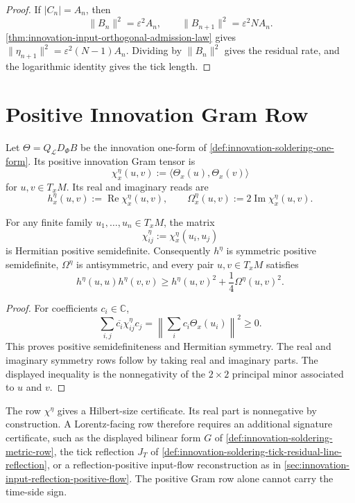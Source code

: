 \begin{proof}
If $|C_n|=A_n$, then
$$
\|B_n\|^2=\varepsilon^2A_n,
\qquad
\|B_{n+1}\|^2=\varepsilon^2NA_n.
$$
\autoref{thm:innovation-input-orthogonal-admission-law} gives
$\|\eta_{n+1}\|^2=\varepsilon^2(N-1)A_n$. Dividing by $\|B_n\|^2$ gives
the residual rate, and the logarithmic identity gives the tick length.
\end{proof}

\section{Positive Innovation Gram Row}
\label{sec:innovation-input-positive-gram-row}

\begin{definition}
\label{def:innovation-input-gram-tensor}
Let $\Theta=Q_{\mathcal L}D_{\Phi}B$ be the innovation one-form of
\autoref{def:innovation-soldering-one-form}. Its positive innovation Gram
tensor is
$$
\chi^\eta_x(u,v)
:=
\langle \Theta_x(u),\Theta_x(v)\rangle
$$
for $u,v\in T_xM$. Its real and imaginary reads are
$$
h^\eta_x(u,v):=\operatorname{Re}\chi^\eta_x(u,v),
\qquad
\Omega^\eta_x(u,v):=2\operatorname{Im}\chi^\eta_x(u,v).
$$
\end{definition}

\begin{theorem}
\label{thm:innovation-input-positive-gram-constraint}
For any finite family $u_1,\ldots,u_n\in T_xM$, the matrix
$$
\chi^\eta_{ij}:=\chi^\eta_x(u_i,u_j)
$$
is Hermitian positive semidefinite. Consequently $h^\eta$ is symmetric
positive semidefinite, $\Omega^\eta$ is antisymmetric, and every pair
$u,v\in T_xM$ satisfies
$$
h^\eta(u,u)h^\eta(v,v)
\ge
h^\eta(u,v)^2+\frac14\Omega^\eta(u,v)^2.
$$
\end{theorem}

\begin{proof}
For coefficients $c_i\in\mathbb C$,
$$
\sum_{i,j}\overline{c_i}\chi^\eta_{ij}c_j
=
\left\|\sum_i c_i\Theta_x(u_i)\right\|^2
\ge0.
$$
This proves positive semidefiniteness and Hermitian symmetry. The real and
imaginary symmetry rows follow by taking real and imaginary parts. The
displayed inequality is the nonnegativity of the $2\times2$ principal minor
associated to $u$ and $v$.
\end{proof}

\begin{principle}
\label{prin:innovation-input-positive-size-not-lorentz}
The row $\chi^\eta$ gives a Hilbert-size certificate. Its real part is
nonnegative by construction. A Lorentz-facing row therefore requires an
additional signature certificate, such as the displayed bilinear form
$G$ of \autoref{def:innovation-soldering-metric-row}, the tick reflection
$J_T$ of \autoref{def:innovation-soldering-tick-residual-line-reflection},
or a reflection-positive input-flow reconstruction as in
\autoref{sec:innovation-input-reflection-positive-flow}. The positive Gram
row alone cannot carry the time-side sign.
\end{principle}

